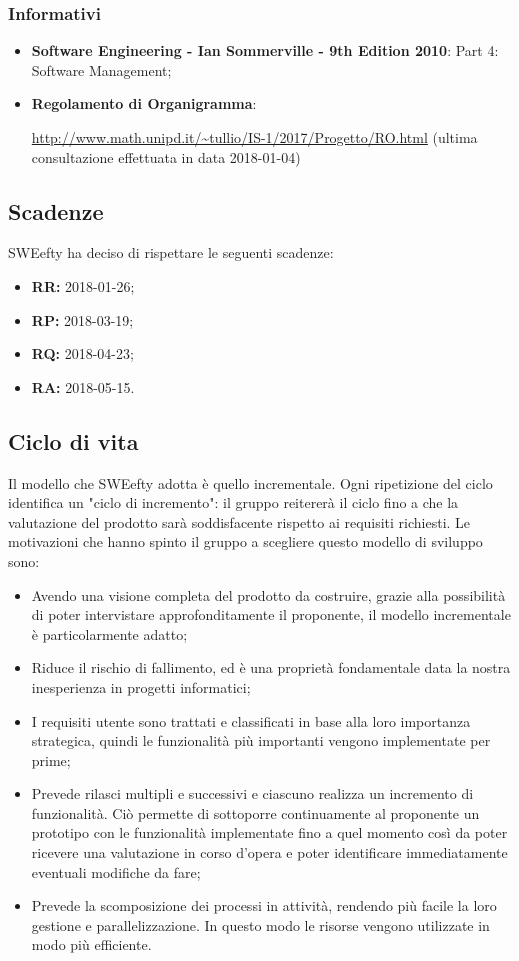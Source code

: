 			\subsubsection{Informativi}
			\begin{itemize}
				\item \textbf{Software Engineering - Ian Sommerville - 9th Edition 2010}:  Part 4: Software Management;
				\item \textbf{Regolamento di Organigramma}: \par
				\url{http://www.math.unipd.it/~tullio/IS-1/2017/Progetto/RO.html} (ultima consultazione effettuata in data 2018-01-04)
			\end{itemize}
			
	\subsection{Scadenze}
	\label{scadenze}
	SWEefty ha deciso di rispettare le seguenti scadenze:
	\begin{itemize}
		\item \textbf{RR:} 2018-01-26;
		\item \textbf{RP:} 2018-03-19;
		\item \textbf{RQ:} 2018-04-23;
		\item \textbf{RA:} 2018-05-15.
	\end{itemize}
	\subsection{Ciclo di vita}	
	Il modello che SWEefty adotta è quello incrementale. Ogni ripetizione del ciclo identifica un "ciclo di incremento": il gruppo reitererà il ciclo fino a che la valutazione del prodotto sarà soddisfacente rispetto ai requisiti richiesti.
	Le motivazioni che hanno spinto il gruppo a scegliere questo modello di sviluppo sono:
	\begin{itemize}
		\item Avendo una visione completa del prodotto da costruire, grazie alla possibilità di poter intervistare approfonditamente il proponente, il modello incrementale è particolarmente adatto;
		\item Riduce il rischio di fallimento, ed è una proprietà fondamentale data la nostra inesperienza in progetti informatici;
		\item I requisiti utente sono trattati e classificati in base alla loro importanza strategica, quindi le funzionalità più importanti vengono implementate per prime;
		\item Prevede rilasci multipli e successivi e ciascuno realizza un incremento di funzionalità. Ciò permette di sottoporre continuamente al proponente un prototipo con le funzionalità implementate fino a quel momento così da poter ricevere una valutazione in corso d'opera e poter identificare immediatamente eventuali modifiche da fare;
		\item Prevede la scomposizione dei processi in attività, rendendo più facile la loro gestione e parallelizzazione. In questo modo le risorse vengono utilizzate in modo più efficiente.
	\end{itemize}
